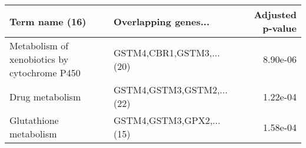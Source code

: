 \begin{tabular}{llr}
\toprule
                              Term name (16) &      Overlapping genes... &  Adjusted p-value \\
\midrule
Metabolism of xenobiotics by cytochrome P450 &  GSTM4,CBR1,GSTM3,...(20) &          8.90e-06 \\
                             Drug metabolism & GSTM4,GSTM3,GSTM2,...(22) &          1.22e-04 \\
                      Glutathione metabolism &  GSTM4,GSTM3,GPX2,...(15) &          1.58e-04 \\
\bottomrule
\end{tabular}
